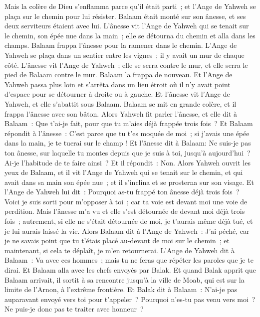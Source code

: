 \begin{multicols}{2}
Mais la colère de Dieu s'enflamma parce qu'il était parti~; et l'Ange de Yahweh se plaça sur le chemin pour lui résister. Balaam était monté sur son ânesse, et ses deux serviteurs étaient avec lui.
L'ânesse vit l'Ange de Yahweh qui se tenait sur le chemin, son épée nue dans la main~; elle se détourna du chemin et alla dans les champs. Balaam frappa l'ânesse pour la ramener dans le chemin.
L'Ange de Yahweh se plaça dans un sentier entre les vignes~; il y avait un mur de chaque côté.
L'ânesse vit l'Ange de Yahweh~; elle se serra contre le mur, et elle serra le pied de Balaam contre le mur. Balaam la frappa de nouveau.
Et l'Ange de Yahweh passa plus loin et s'arrêta dans un lieu étroit où il n'y avait point d'espace pour se détourner à droite ou à gauche.
Et l'ânesse vit l'Ange de Yahweh, et elle s'abattit sous Balaam. Balaam se mit en grande colère, et il frappa l'ânesse avec son bâton.
Alors Yahweh fit parler l'ânesse, et elle dit à Balaam~: Que t'ai-je fait, pour que tu m'aies déjà frappée trois fois~?
Et Balaam répondit à l'ânesse~: C'est parce que tu t'es moquée de moi~; si j'avais une épée dans la main, je te tuerai sur le champ !
Et l'ânesse dit à Balaam: Ne suis-je pas ton ânesse, sur laquelle tu montes depuis que je suis à toi, jusqu'à aujourd'hui~? Ai-je l'habitude de te faire ainsi~? Et il répondit~: Non.
Alors Yahweh ouvrit les yeux de Balaam, et il vit l'Ange de Yahweh qui se tenait sur le chemin, et qui avait dans sa main son épée nue~; et il s'inclina et se prosterna sur son visage.
Et l'Ange de Yahweh lui dit~: Pourquoi as-tu frappé ton ânesse déjà trois fois~? Voici je suis sorti pour m'opposer à toi~; car ta voie est devant moi une voie de perdition.
Mais l'ânesse m'a vu et elle s'est détournée de devant moi déjà trois fois~; autrement, si elle ne s'était détournée de moi, je t'aurais même déjà tué, et je lui aurais laissé la vie.
Alors Balaam dit à l'Ange de Yahweh~: J'ai péché, car je ne savais point que tu t'étais placé au-devant de moi sur le chemin~; et maintenant, si cela te déplaît, je m'en retournerai.
L'Ange de Yahweh dit à Balaam~: Va avec ces hommes~; mais tu ne feras que répéter les paroles que je te dirai. Et Balaam alla avec les chefs envoyés par Balak.
Et quand Balak apprit que Balaam arrivait, il sortit à sa rencontre jusqu'à la ville de Moab, qui est sur la limite de l'Arnon, à l'extrême frontière.
Et Balak dit à Balaam~: N'ai-je pas auparavant envoyé vers toi pour t'appeler~? Pourquoi n'es-tu pas venu vers moi~? Ne puis-je donc pas te traiter avec honneur~?

\end{multicols}
